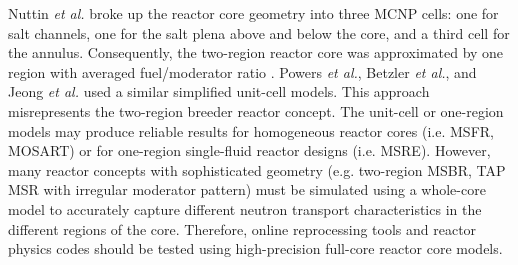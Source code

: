 Nuttin \emph{et al.} broke up the reactor core geometry into three \gls{MCNP} cells: 
one for salt channels, one for the salt plena above and below the core, and a 
third cell for the annulus. Consequently, the two-region reactor core was 
approximated by one region with averaged fuel/moderator ratio 
\cite{nuttin_potential_2005}.  Powers \emph{et 
al.}, Betzler \emph{et al.}, and Jeong \emph{et al.} 
\cite{powers_new_2013,powers_inventory_2014,betzler_modeling_2016, 
betzler_molten_2017, jeong_development_2014, jeong_equilibrium_2016} used a 
similar simplified unit-cell models. This approach 
misrepresents the two-region breeder reactor concept. The unit-cell or one-region 
models may produce reliable results for homogeneous reactor cores (i.e. 
\gls{MSFR}, \gls{MOSART}) or for one-region single-fluid reactor designs (i.e. 
\gls{MSRE}). However, many reactor concepts with sophisticated geometry (e.g. 
two-region \gls{MSBR}, \gls{TAP} \gls{MSR} with irregular moderator pattern) must 
be simulated using a whole-core model to accurately capture different neutron 
transport characteristics in the 
different regions of the core. Therefore, online reprocessing tools and reactor 
physics codes should be tested using high-precision full-core reactor core models.

